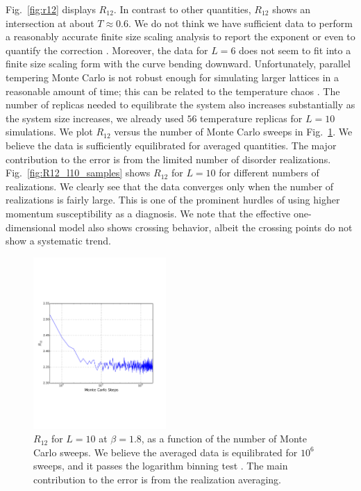 \documentclass[aps,prb,twocolumn,showpacs,superscriptaddress]{revtex4}
\begin{document}
Fig.~\ref{fig:r12} displays $R_{12}$. In contrast to other quantities, $R_{12}$ shows an intersection 
at about $T \approx 0.6$. We do not think we have sufficient data to perform a reasonably accurate finite size 
scaling analysis to report the exponent or even to quantify the correction \cite{Hasenbusch-etal-2008}.
Moreover, the data for $L=6$ does not seem to fit into a finite size scaling form with the curve bending downward.
Unfortunately, parallel tempering Monte Carlo is not robust enough for simulating larger lattices in a reasonable 
amount of time; this can be related to the temperature chaos \cite{Ritort-1994,Fernandez-etal-2013,Katzgraber-etal-2007}. The number of replicas needed to equilibrate the system also 
increases substantially as the system size increases, we already used $56$ temperature 
replicas for $L=10$ simulations. We plot $R_{12}$ versus the number of Monte 
Carlo sweeps in Fig.~\ref{fig:MCsteps}. We believe the data is sufficiently equilibrated for averaged quantities.
The major contribution to the error is from the limited number of disorder realizations. Fig.~\ref{fig:R12_l10_samples} shows $R_{12}$ 
for $L=10$ for different numbers of realizations. We clearly see that the data converges only when the number of realizations is fairly large.
This is one of the prominent hurdles of using higher momentum susceptibility as a diagnosis. 
We note that the effective one-dimensional model also shows crossing behavior,
albeit the crossing points do not show a systematic trend\cite{Larson-etal-2013}.


\begin{figure}[ht]
  \includegraphics[width=0.45\textwidth]{img/eq_l10.pdf}
  \caption{\label{fig:MCsteps} $R_{12}$ for $L=10$ at $\beta=1.8$, as a function of the 
number of Monte Carlo sweeps.  We believe the averaged data is equilibrated 
for $10^6$  sweeps, and it passes the logarithm binning 
test \cite{Alvarez-etal-2010}. The main contribution to the error is from the realization 
averaging.}
\end{figure}
\end{document}
